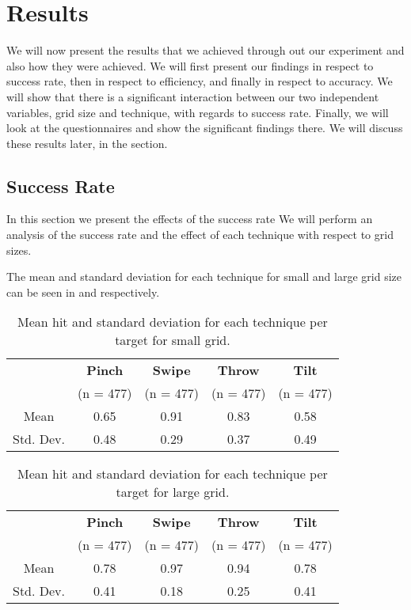 \section{Results}
We will now present the results that we achieved through out our experiment and also how they were achieved. We will first present our findings in respect to success rate, then in respect to efficiency, and finally in respect to accuracy. We will show that there is a significant interaction between our two independent variables, grid size and technique, with regards to success rate. Finally, we will look at the questionnaires and show the significant findings there. We will discuss these results later, in the  section.  

\subsection{Success Rate}
In this section we present the effects of the success rate 
We will perform an analysis of the success rate and the effect of each technique with respect to grid sizes.

The mean and standard deviation for each technique for small and large grid size can be seen in  and  respectively. 

\begin{table}[H]
	\centering
	\begin{tabular}{|c|c|c|c|c|}
			\hline
			\rowcolor[HTML]{9B9B9B} 
			& \textbf{Pinch} & \textbf{Swipe} & \textbf{Throw} & \textbf{Tilt} \\
			\rowcolor[HTML]{9B9B9B} 
			 & (n = 477) & (n = 477) & (n = 477) & (n = 477) \\ \hline
			Mean & 0.65         & 0.91          & 0.83          & 0.58         \\ \hline
			Std. Dev. & 0.48 & 0.29 & 0.37 & 0.49 \\ \hline
	\end{tabular}
	\caption{Mean hit  and standard deviation for each technique per target for small grid.}
	\label{tab:meanHitTechniqueSmall}
\end{table}

\begin{table}[H]
	\centering
	\begin{tabular}{|c|c|c|c|c|}
			\hline
			\rowcolor[HTML]{9B9B9B} 
			& \textbf{Pinch} & \textbf{Swipe} & \textbf{Throw} & \textbf{Tilt} \\
			\rowcolor[HTML]{9B9B9B} 
			 & (n = 477) & (n = 477) & (n = 477) & (n = 477) \\ \hline
			Mean & 0.78         & 0.97          & 0.94          & 0.78         \\ \hline
			Std. Dev. & 0.41 & 0.18 & 0.25 & 0.41 \\ \hline
	\end{tabular}
	\caption{Mean hit  and standard deviation for each technique per target for large grid.}
	\label{tab:meanHitTechniqueLarge}
\end{table}


